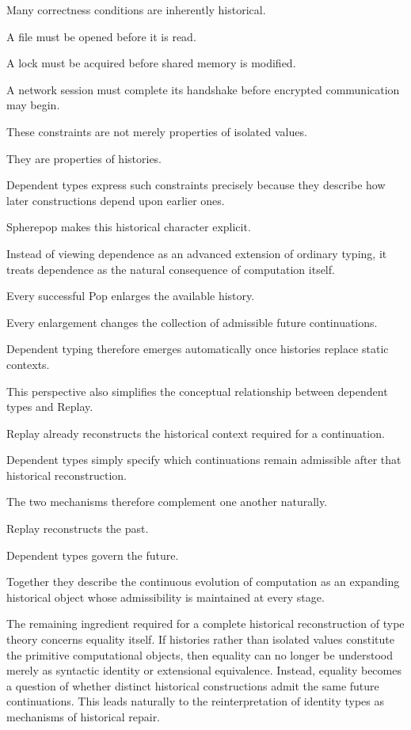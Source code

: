 \documentclass[12pt,oneside]{article}
\theoremstyle{definition}
\theoremstyle{remark}
\begin{document}
Many correctness conditions are inherently historical.

A file must be opened before it is read.

A lock must be acquired before shared memory is modified.

A network session must complete its handshake before encrypted communication
may begin.

These constraints are not merely properties of isolated values.

They are properties of histories.

Dependent types express such constraints precisely because they describe how
later constructions depend upon earlier ones.

Spherepop makes this historical character explicit.

Instead of viewing dependence as an advanced extension of ordinary typing, it
treats dependence as the natural consequence of computation itself.

Every successful Pop enlarges the available history.

Every enlargement changes the collection of admissible future continuations.

Dependent typing therefore emerges automatically once histories replace static
contexts.

This perspective also simplifies the conceptual relationship between dependent
types and Replay.

Replay already reconstructs the historical context required for a continuation.

Dependent types simply specify which continuations remain admissible after that
historical reconstruction.

The two mechanisms therefore complement one another naturally.

Replay reconstructs the past.

Dependent types govern the future.

Together they describe the continuous evolution of computation as an expanding
historical object whose admissibility is maintained at every stage.

The remaining ingredient required for a complete historical reconstruction of
type theory concerns equality itself. If histories rather than isolated values
constitute the primitive computational objects, then equality can no longer be
understood merely as syntactic identity or extensional equivalence. Instead,
equality becomes a question of whether distinct historical constructions admit
the same future continuations. This leads naturally to the reinterpretation of
identity types as mechanisms of historical repair.
\end{document}
